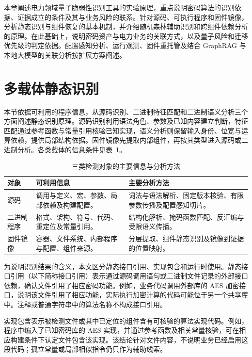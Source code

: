 \renewcommand{\algorithmicrequire}{\textbf{输入：}}
\renewcommand{\algorithmicensure}{\textbf{输出：}}

本章阐述电力领域量子脆弱性识别工具的实验原理，重点说明密码算法的识别依据、证据成立的条件及其与业务风险的联系。针对源码、可执行程序和固件镜像，分析静态识别与组件恢复的基本机制，并介绍随机森林辅助识别和跨组件依赖分析的原理。在此基础上，说明密码资产与电力业务的关联方式，以及量子风险和迁移优先级的判定依据。配置感知分析、运行观测、固件重托管及结合 GraphRAG 与本地大模型的关联分析按扩展方案阐述。

\section{多载体静态识别}
\label{sec:implementation-principles}

本节依据可利用的程序信息，从源码识别、二进制特征匹配和二进制语义分析三个方面阐述静态识别原理。源码识别利用语法角色、参数及已知内容建立判断，特征匹配通过参考函数与常量引用核验已知实现，语义分析则保留输入身份、位宽与运算依赖，提供局部结构依据。固件镜像先提取内部组件，再按其类型进入源码或二进制分析。各类载体的信息条件见表~\ref{tab:carrier-principle-map}。

\begin{table}[htbp]\centering\small
  \caption{三类检测对象的主要信息与分析方法}
  \label{tab:carrier-principle-map}
  \begin{tabularx}{\linewidth}{@{}p{1.8cm}X X@{}}\toprule
  对象 & 可利用信息 & 主要分析方法\\\midrule
  源码 & 调用与定义、宏、参数、局部依赖及构建配置。 & 词法与语法解析、固定版本核验、有限参数传播及配置感知切片。\\
  二进制程序 & 格式、架构、符号、代码、重定位及常量引用。 & 结构化解析、掩码函数匹配、反汇编与受限语义传播。\\
  固件镜像 & 容器、文件系统、内部程序与配置、组件来源。 & 分层提取、组件静态识别及镜像到证据的位置映射。\\\bottomrule
  \end{tabularx}
\end{table}

为说明识别结果的含义，本文区分静态接口引用、实现包含和运行时使用。静态接口引用（以下简称接口引用）表示通过源码调用语句或二进制文件记录的外部接口依赖，确认文件引用了相应密码功能。例如，业务代码调用外部库的 AES 加密接口，说明该文件引用了相应功能，实际执行加密计算的代码可能位于另一个共享库中。注释或普通字符串中的算法名称不构成接口引用。

实现包含表示被检测文件或其中已定位的组件含有可核验的算法实现代码。例如，程序中编入了已知密码库的 AES 实现，并通过参考函数及相关常量核验，可在相应构建条件下认定文件包含该实现。该结论针对文件内容，不说明业务已经启用这段代码；孤立常量或局部相似指令仍只作为辅助线索。

